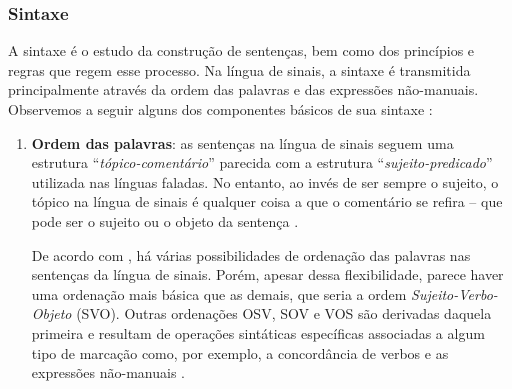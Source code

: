 \subsubsection{Sintaxe}
\label{linguistica-gramatica-sintaxe}

A sintaxe é o estudo da construção de sentenças, bem como dos princípios e regras que regem esse processo. Na língua de sinais, a sintaxe é transmitida principalmente através da ordem das palavras e das expressões não-manuais.
Observemos a seguir alguns dos componentes básicos de sua sintaxe \cite{jay-2011-dont-just-sign,hill-2019-sign-languages,quadros-2004-estudos-linguisticos}:

\begin{enumerate}
    \item \textbf{Ordem das palavras}: as sentenças na língua de sinais seguem uma estrutura ``\textit{tópico-comentário}'' parecida com a estrutura ``\textit{sujeito-predicado}'' utilizada nas línguas faladas. No entanto, ao invés de ser sempre o sujeito, o tópico na língua de sinais é qualquer coisa a que o comentário se refira -- que pode ser o sujeito ou o objeto da sentença \cite{jay-2011-dont-just-sign}. 
    
    De acordo com , há várias possibilidades de ordenação das palavras nas sentenças da língua de sinais. Porém, apesar dessa flexibilidade, parece haver uma ordenação mais básica que as demais, que seria a ordem \textit{Sujeito-Verbo-Objeto} (SVO). 
    Outras ordenações OSV, SOV e VOS são derivadas daquela primeira e resultam de operações sintáticas específicas  associadas a algum tipo de marcação como, por exemplo, a concordância de verbos e as expressões não-manuais \cite{quadros-2004-estudos-linguisticos}. 
    
    




\end{enumerate}
